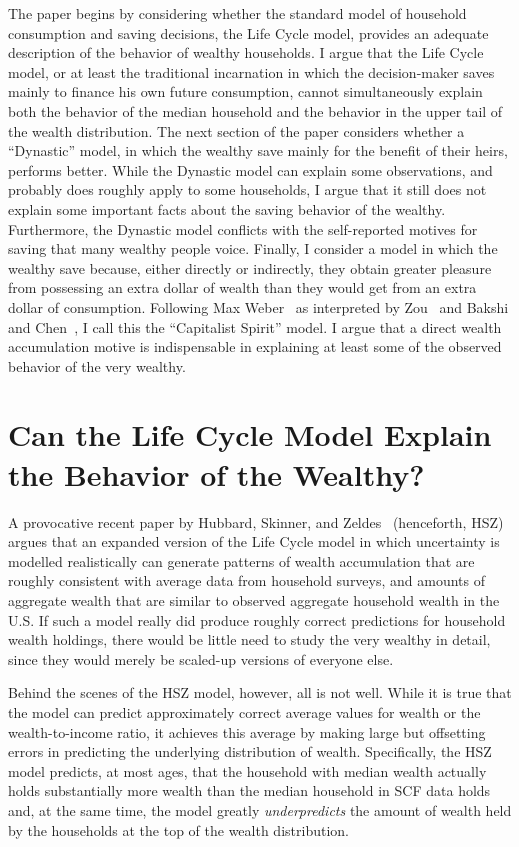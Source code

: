 \documentclass[titlepage,12pt]{article}
\begin{document}
The paper begins by considering whether the standard model of 
household consumption and saving decisions, the Life Cycle model, 
provides an adequate description of the behavior of wealthy 
households.  I argue that the Life Cycle model, or at least the 
traditional incarnation in which the decision-maker saves mainly to 
finance his own future consumption, cannot simultaneously explain both 
the behavior of the median household and the behavior in the 
upper tail of the wealth distribution.  The next section of the paper 
considers whether a ``Dynastic'' model, in which the wealthy save 
mainly for the benefit of their heirs, performs better.  While the 
Dynastic model can explain some observations, and probably does 
roughly apply to some households, I argue that it still does not 
explain some important facts about the saving behavior of the wealthy.  
Furthermore, the Dynastic model conflicts with the self-reported 
motives for saving that many wealthy people voice.  Finally, I 
consider a model in which the wealthy save because, either directly or 
indirectly, they obtain greater pleasure from possessing an extra 
dollar of wealth than they would get from an extra dollar of 
consumption.  Following Max Weber~\cite{weber:capitalism} as 
interpreted by Zou~\cite{zou:spirit} and Bakshi and 
Chen~\cite{bakshi&chen:spirit}, I call this the ``Capitalist Spirit'' 
model.  I argue that a direct wealth accumulation motive is 
indispensable in explaining at least some of the observed behavior of 
the very wealthy.

\hypertarget{can-the-life-cycle-model-explain-the-behavior-of-the-wealthy}{}
\section{Can the Life Cycle Model Explain the Behavior of the Wealthy?}
\label{sec:LCModel}
A provocative recent paper by Hubbard, Skinner, and 
Zeldes~\cite{hsz:importance} (henceforth, HSZ) argues that an expanded 
version of the Life Cycle model in which uncertainty is modelled 
realistically can generate patterns of wealth accumulation that are 
roughly consistent with average data from household surveys, and 
amounts of aggregate wealth that are similar to observed aggregate 
household wealth in the U.S. If such a model really did produce 
roughly correct predictions for household wealth holdings, there would 
be little need to study the very wealthy in detail, since they would 
merely be scaled-up versions of everyone else.

Behind the scenes of the HSZ model, however, all is not well.  While 
it is true that the model can predict approximately correct average 
values for wealth or the wealth-to-income ratio, it achieves this 
average by making large but offsetting errors in predicting the 
underlying distribution of wealth.  Specifically, the HSZ model 
predicts, at most ages, that the household with median wealth actually 
holds substantially more wealth than the median household in SCF data 
holds and, at the same time, the model greatly {\it underpredicts} the 
amount of wealth held by the households at the top of the wealth 
distribution.
\end{document}

